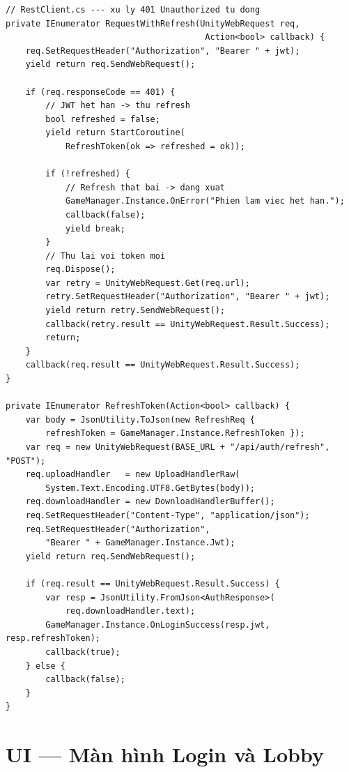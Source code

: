 \documentclass[12pt,a4paper]{report}
\begin{document}
\begin{lstlisting}[style=bashStyle, caption={JWT refresh tự động khi token hết hạn (401)}, label={lst:jwtrefresh}]
// RestClient.cs --- xu ly 401 Unauthorized tu dong
private IEnumerator RequestWithRefresh(UnityWebRequest req,
                                        Action<bool> callback) {
    req.SetRequestHeader("Authorization", "Bearer " + jwt);
    yield return req.SendWebRequest();

    if (req.responseCode == 401) {
        // JWT het han -> thu refresh
        bool refreshed = false;
        yield return StartCoroutine(
            RefreshToken(ok => refreshed = ok));

        if (!refreshed) {
            // Refresh that bai -> dang xuat
            GameManager.Instance.OnError("Phien lam viec het han.");
            callback(false);
            yield break;
        }
        // Thu lai voi token moi
        req.Dispose();
        var retry = UnityWebRequest.Get(req.url);
        retry.SetRequestHeader("Authorization", "Bearer " + jwt);
        yield return retry.SendWebRequest();
        callback(retry.result == UnityWebRequest.Result.Success);
        return;
    }
    callback(req.result == UnityWebRequest.Result.Success);
}

private IEnumerator RefreshToken(Action<bool> callback) {
    var body = JsonUtility.ToJson(new RefreshReq {
        refreshToken = GameManager.Instance.RefreshToken });
    var req = new UnityWebRequest(BASE_URL + "/api/auth/refresh", "POST");
    req.uploadHandler   = new UploadHandlerRaw(
        System.Text.Encoding.UTF8.GetBytes(body));
    req.downloadHandler = new DownloadHandlerBuffer();
    req.SetRequestHeader("Content-Type", "application/json");
    req.SetRequestHeader("Authorization",
        "Bearer " + GameManager.Instance.Jwt);
    yield return req.SendWebRequest();

    if (req.result == UnityWebRequest.Result.Success) {
        var resp = JsonUtility.FromJson<AuthResponse>(
            req.downloadHandler.text);
        GameManager.Instance.OnLoginSuccess(resp.jwt, resp.refreshToken);
        callback(true);
    } else {
        callback(false);
    }
}
\end{lstlisting}

\section{UI --- Màn hình Login và Lobby}
\end{document}
